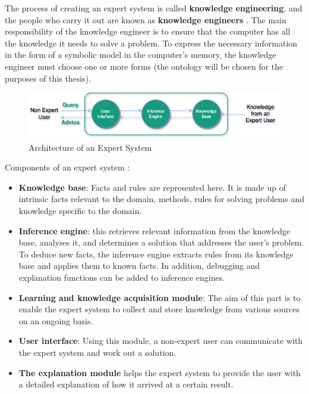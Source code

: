 The process of creating an expert system is called \textbf{knowledge engineering}, and the people who carry it out are known as \textbf{knowledge engineers} \cite{waterman1985guide}. The main responsibility of the knowledge engineer is to ensure that the computer has all the knowledge it needs to solve a problem. To express the necessary information in the form of a symbolic model in the computer's memory, the knowledge engineer must choose one or more forms (the ontology will be chosen for the purposes of this thesis).\\

\begin{figure}[h]
    \centering
    \includegraphics[scale=0.6]{images/Foundation-Architecture_Expert_System.drawio.png}
    \caption{\label{fig:es-archi} Architecture of an Expert System \cite{tripathi2011review} }
\end{figure}

Components of an expert system : 
\begin{itemize}
    \item \textbf{Knowledge base}: Facts and rules are represented here. It is made up of intrinsic facts relevant to the domain, methods, rules for solving problems and knowledge specific to the domain.
    \item \textbf{Inference engine}: this retrieves relevant information from the knowledge base, analyses it, and determines a solution that addresses the user's problem. To deduce new facts, the inference engine extracts rules from its knowledge base and applies them to known facts. In addition, debugging and explanation functions can be added to inference engines.
    \item \textbf{Learning and knowledge acquisition module}: The aim of this part is to enable the expert system to collect and store knowledge from various sources on an ongoing basis.
    \item \textbf{User interface}: Using this module, a non-expert user can communicate with the expert system and work out a solution.
    \item \textbf{The explanation module} helps the expert system to provide the user with a detailed explanation of how it arrived at a certain result.
\end{itemize}


